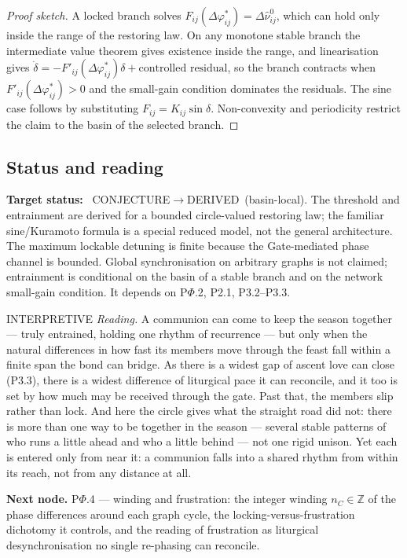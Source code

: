 \documentclass[11pt,a4paper]{article}
\newcommand{\stDerived}{\textcolor{cDer}{\textsf{\small DERIVED}}}
\newcommand{\stInterp}{\textcolor{cInt}{\textsf{\small INTERPRETIVE}}}
\newcommand{\stConj}{\textcolor{cCon}{\textsf{\small CONJECTURE}}}
\theoremstyle{definition}
\theoremstyle{plain}
\theoremstyle{remark}
\begin{document}
\begin{proof}[Proof sketch]
A locked branch solves \(F_{ij}(\Delta\varphi_{ij}^{*})=\Delta\hat\nu_{ij}^{0}\), which can
hold only inside the range of the restoring law. On any monotone stable branch the intermediate
value theorem gives existence inside the range, and linearisation gives
\(\dot\delta=-F'_{ij}(\Delta\varphi_{ij}^{*})\delta+\text{controlled residual}\), so the
branch contracts when \(F'_{ij}(\Delta\varphi_{ij}^{*})>0\) and the small-gain condition
dominates the residuals. The sine case follows by substituting \(F_{ij}=K_{ij}\sin\delta\).
Non-convexity and periodicity restrict the claim to the basin of the selected branch.
\qedhere
\end{proof}

\subsection{Status and reading}

\textbf{Target status:}~
\stConj\(\to\)\stDerived\ (basin-local). The threshold and entrainment are derived for a
bounded circle-valued restoring law; the familiar sine/Kuramoto formula is a special reduced
model, not the general architecture. The maximum lockable detuning is finite because the
Gate-mediated phase channel is bounded. Global synchronisation on arbitrary graphs is not
claimed; entrainment is conditional on the basin of a stable branch and on the network
small-gain condition. It depends on P$\Phi$.2, P2.1, P3.2--P3.3.

\medskip
\stInterp\quad
\emph{Reading.}
A communion can come to keep the season together --- truly entrained, holding one rhythm of
recurrence --- but only when the natural differences in how fast its members move through the
feast fall within a finite span the bond can bridge. As there is a widest gap of ascent love
can close (P3.3), there is a widest difference of liturgical pace it can reconcile, and it too
is set by how much may be received through the gate. Past that, the members slip rather than
lock. And here the circle gives what the straight road did not: there is more than one way to
be together in the season --- several stable patterns of who runs a little ahead and who a
little behind --- not one rigid unison. Yet each is entered only from near it: a communion
falls into a shared rhythm from within its reach, not from any distance at all.

\medskip
\textbf{Next node.} P$\Phi$.4 --- winding and frustration: the integer winding
\(n_C\in\mathbb Z\) of the phase differences around each graph cycle, the
locking-versus-frustration dichotomy it controls, and the reading of frustration as
liturgical desynchronisation no single re-phasing can reconcile.
\end{document}
